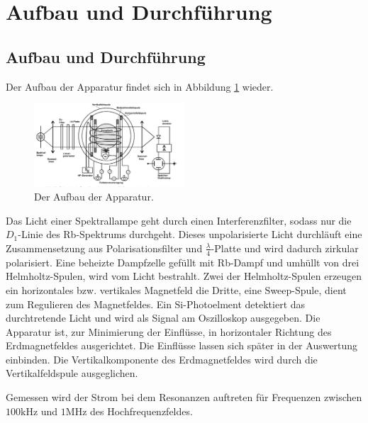 \section{Aufbau und Durchführung}
\label{sec:Durchführung}
\subsection{Aufbau und Durchführung}
Der Aufbau der Apparatur findet sich in Abbildung \ref{fig:aufbau} wieder.
\begin{figure}
    \centering
    \includegraphics[width=0.5\textwidth]{aufbau.PNG}
    \caption{Der Aufbau der Apparatur.\cite{skript}}
    \label{fig:aufbau}
\end{figure}
Das Licht einer Spektrallampe geht durch einen Interferenzfilter, sodass nur die $D_\mathrm{1}$-Linie
des Rb-Spektrums durchgeht. Dieses unpolarisierte Licht durchläuft eine Zusammensetzung aus Polarisationsfilter
und $\frac{\lambda}{4}$-Platte und wird dadurch zirkular polarisiert.
Eine beheizte Dampfzelle gefüllt mit Rb-Dampf und umhüllt von drei Helmholtz-Spulen, wird vom Licht bestrahlt.
Zwei der Helmholtz-Spulen erzeugen ein horizontales bzw. vertikales Magnetfeld die Dritte, eine Sweep-Spule,
dient zum Regulieren des Magnetfeldes. Ein Si-Photoelment detektiert das durchtretende Licht und wird als Signal
am Oszilloskop ausgegeben.
Die Apparatur ist, zur Minimierung der Einflüsse, in horizontaler Richtung des Erdmagnetfeldes ausgerichtet.
Die Einflüsse lassen sich später in der Auswertung einbinden.
Die Vertikalkomponente des Erdmagnetfeldes wird durch die Vertikalfeldspule ausgeglichen.

Gemessen wird der Strom bei dem Resonanzen auftreten für Frequenzen zwischen $100\si{\kilo\hertz}$ und $1\si{\mega\hertz}$
des Hochfrequenzfeldes.
